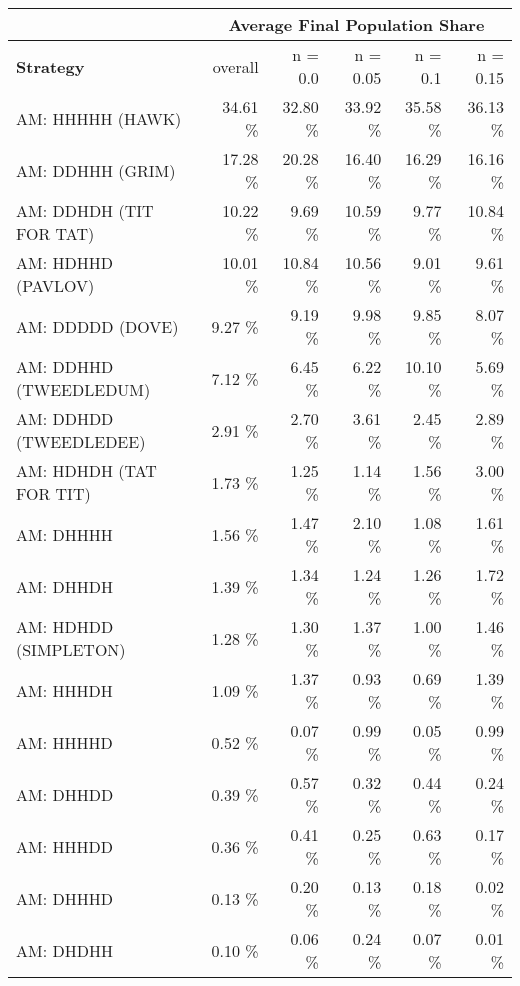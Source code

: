 \begin{tabular}{|l|r|r|r|r|r|}
\hline
 & \multicolumn{5}{c|}{{\bf Average Final Population Share}} \\
\hline
{\bf Strategy} & overall &  n = 0.0 & n = 0.05 & n = 0.1 & n = 0.15\\ \hline
AM: HHHHH (HAWK)             &   34.61 \%  &   32.80 \%  &   33.92 \%  &   35.58 \%  &   36.13 \% \\
AM: DDHHH (GRIM)             &   17.28 \%  &   20.28 \%  &   16.40 \%  &   16.29 \%  &   16.16 \% \\
AM: DDHDH (TIT FOR TAT)      &   10.22 \%  &    9.69 \%  &   10.59 \%  &    9.77 \%  &   10.84 \% \\
AM: HDHHD (PAVLOV)           &   10.01 \%  &   10.84 \%  &   10.56 \%  &    9.01 \%  &    9.61 \% \\
AM: DDDDD (DOVE)             &    9.27 \%  &    9.19 \%  &    9.98 \%  &    9.85 \%  &    8.07 \% \\
AM: DDHHD (TWEEDLEDUM)       &    7.12 \%  &    6.45 \%  &    6.22 \%  &   10.10 \%  &    5.69 \% \\
AM: DDHDD (TWEEDLEDEE)       &    2.91 \%  &    2.70 \%  &    3.61 \%  &    2.45 \%  &    2.89 \% \\
AM: HDHDH (TAT FOR TIT)      &    1.73 \%  &    1.25 \%  &    1.14 \%  &    1.56 \%  &    3.00 \% \\
AM: DHHHH                    &    1.56 \%  &    1.47 \%  &    2.10 \%  &    1.08 \%  &    1.61 \% \\
AM: DHHDH                    &    1.39 \%  &    1.34 \%  &    1.24 \%  &    1.26 \%  &    1.72 \% \\
AM: HDHDD (SIMPLETON)        &    1.28 \%  &    1.30 \%  &    1.37 \%  &    1.00 \%  &    1.46 \% \\
AM: HHHDH                    &    1.09 \%  &    1.37 \%  &    0.93 \%  &    0.69 \%  &    1.39 \% \\
AM: HHHHD                    &    0.52 \%  &    0.07 \%  &    0.99 \%  &    0.05 \%  &    0.99 \% \\
AM: DHHDD                    &    0.39 \%  &    0.57 \%  &    0.32 \%  &    0.44 \%  &    0.24 \% \\
AM: HHHDD                    &    0.36 \%  &    0.41 \%  &    0.25 \%  &    0.63 \%  &    0.17 \% \\
AM: DHHHD                    &    0.13 \%  &    0.20 \%  &    0.13 \%  &    0.18 \%  &    0.02 \% \\
AM: DHDHH                    &    0.10 \%  &    0.06 \%  &    0.24 \%  &    0.07 \%  &    0.01 \% \\

\end{tabular}
